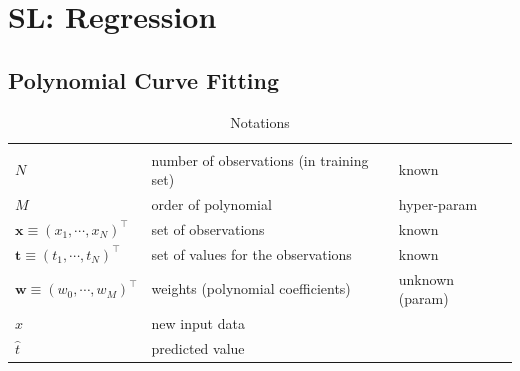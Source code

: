 \chapter{SL: Regression}

\section{Polynomial Curve Fitting}

\begin{customArrayStretch}{1.5}
\begin{longtable}{l l l}

\hline\endfirsthead
\hline\endhead
\hline\endfoot
\hline
\caption*{Notations} \\
\endlastfoot

$N$ & number of observations (in training set) & known \\ \hline

$M$ & order of polynomial & hyper-param \\ \hline

$\bm{x} \equiv (x_1, \cdots , x_N)^\top$ & set of observations & known \\ \hline

$\bm{t} \equiv (t_1, \cdots , t_N)^\top$ & set of values for the observations & known \\ \hline

$\bm{w} \equiv (w_0, \cdots , w_M)^\top$ & weights (polynomial coefficients) & unknown (param) \\ \hline

$\hat{x}$ & new input data & \\ \hline

$\hat{t}$ & predicted value & \\ \hline

\end{longtable}
\end{customArrayStretch}

